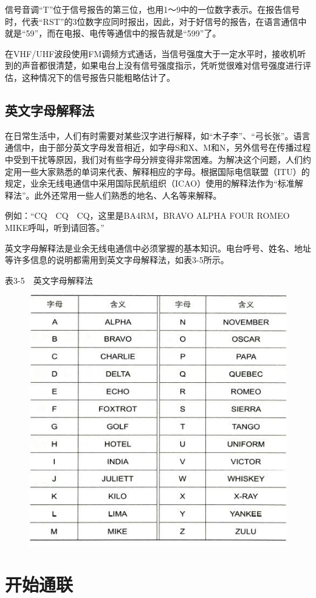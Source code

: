 \documentclass[12pt,UTF8]{ctexbook}
\begin{document}
信号音调“T”位于信号报告的第三位，也用1～9中的一位数字表示。在报告信号时，代表“RST”的3位数字应同时报出，因此，对于好信号的报告，在语言通信中就是“59”，而在电报、电传等通信中的报告就是“599”了。

在VHF/UHF波段使用FM调频方式通话，当信号强度大于一定水平时，接收机听到的声音都很清楚，如果电台上没有信号强度指示，凭听觉很难对信号强度进行评估，这种情况下的信号报告只能粗略估计了。

\subsection{英文字母解释法}

在日常生活中，人们有时需要对某些汉字进行解释，如“木子李”、“弓长张”。语言通信中，由于部分英文字母发音相近，如字母S和X、M和N，另外信号在传播过程中受到干扰等原因，我们对有些字母分辨变得非常困难。为解决这个问题，人们约定用一些大家熟悉的单词来代表、解释相应的字母。根据国际电信联盟（ITU）的规定，业余无线电通信中采用国际民航组织（ICAO）使用的解释法作为“标准解释法”。此外还常用一些人们熟悉的地名、人名等来解释。

例如：“CQ　CQ　CQ，这里是BA4RM，BRAVO ALPHA FOUR ROMEO MIKE呼叫，听到请回答。”

英文字母解释法是业余无线电通信中必须掌握的基本知识。电台呼号、姓名、地址等许多信息的说明都需用到英文字母解释法，如表3-5所示。

表3-5　英文字母解释法

\begin{figure}[htbp]
	\centering
	\includegraphics[width=0.7\linewidth]{36}
	\caption{}
	\label{fig:1}
\end{figure}

\section{开始通联}
\end{document}
